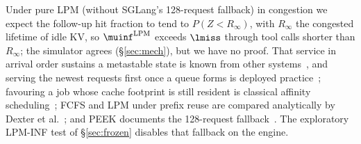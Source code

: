 \begin{remark}
Under pure LPM (without SGLang's 128-request fallback) in congestion we expect the follow-up hit fraction to tend to $P(Z<R_\infty)$, with $R_\infty$ the congested lifetime of idle KV, so $\muinf^{\mathrm{LPM}}$ exceeds $\lmiss$ through tool calls shorter than $R_\infty$; the simulator agrees (\S\ref{sec:mech}), but we have no proof. That service in arrival order sustains a metastable state is known from other systems~\citep{bronson2021metastable,farahbakhsh2026characterizing}, and serving the newest requests first once a queue forms is deployed practice~\citep{maurer2015fail}; favouring a job whose cache footprint is still resident is classical affinity scheduling~\citep{squillante1993affinity}; FCFS and LPM under prefix reuse are compared analytically by Dexter et al.~\citep{dexter2025prefix}; and PEEK documents the 128-request fallback~\citep{xie2026peek}. The exploratory LPM-INF test of \S\ref{sec:frozen} disables that fallback on the engine.
\end{remark}


